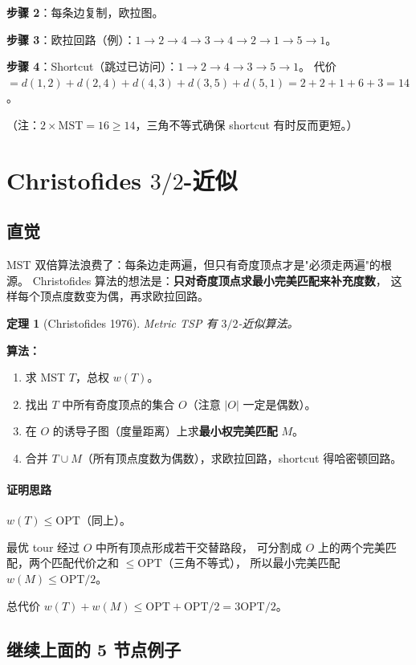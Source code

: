 \documentclass[UTF8,openany,12pt]{ctexbook}
\newtheorem{theorem}{定理}[chapter]
\theoremstyle{remark}
\newcommand{\proofidea}[1]{\paragraph{证明思路}#1}
\newcommand{\OPT}{\mathrm{OPT}}
\begin{document}
\textbf{步骤 2}：每条边复制，欧拉图。

\textbf{步骤 3}：欧拉回路（例）：$1\to 2\to 4\to 3\to 4\to 2\to 1\to 5\to 1$。

\textbf{步骤 4}：Shortcut（跳过已访问）：$1\to 2\to 4\to 3\to 5\to 1$。
代价 $= d(1,2)+d(2,4)+d(4,3)+d(3,5)+d(5,1) = 2+2+1+6+3 = 14$。

（注：$2 \times \text{MST} = 16 \ge 14$，三角不等式确保 shortcut 有时反而更短。）

\section[Christofides 3/2-近似]{Christofides $3/2$-近似}

\subsection{直觉}

MST 双倍算法浪费了：每条边走两遍，但只有奇度顶点才是"必须走两遍"的根源。
Christofides 算法的想法是：\textbf{只对奇度顶点求最小完美匹配来补充度数}，
这样每个顶点度数变为偶，再求欧拉回路。

\begin{theorem}[Christofides 1976]
Metric TSP 有 $3/2$-近似算法。
\end{theorem}

\textbf{算法：}

\begin{enumerate}
  \item 求 MST $T$，总权 $w(T)$。
  \item 找出 $T$ 中所有奇度顶点的集合 $O$（注意 $|O|$ 一定是偶数）。
  \item 在 $O$ 的诱导子图（度量距离）上求\textbf{最小权完美匹配} $M$。
  \item 合并 $T \cup M$（所有顶点度数为偶数），求欧拉回路，shortcut 得哈密顿回路。
\end{enumerate}

\proofidea{
$w(T) \le \OPT$（同上）。

最优 tour 经过 $O$ 中所有顶点形成若干交替路段，
可分割成 $O$ 上的两个完美匹配，两个匹配代价之和 $\le \OPT$（三角不等式），
所以最小完美匹配 $w(M) \le \OPT/2$。

总代价 $w(T)+w(M) \le \OPT + \OPT/2 = 3\OPT/2$。
}

\subsection{继续上面的 5 节点例子}
\end{document}
